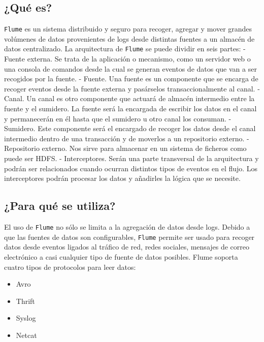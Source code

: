 \documentclass[]{article}
\begin{document}
\subsection{¿Qué es?}\label{que-es}

\texttt{Flume} es un sistema distribuido y seguro para recoger, agregar
y mover grandes volúmenes de datos provenientes de logs desde distintas
fuentes a un almacén de datos centralizado. La arquitectura de
\texttt{Flume} se puede dividir en seis partes: - Fuente externa. Se
trata de la aplicación o mecanismo, como un servidor web o una consola
de comandos desde la cual se generan eventos de datos que van a ser
recogidos por la fuente. - Fuente. Una fuente es un componente que se
encarga de recoger eventos desde la fuente externa y pasárselos
transaccionalmente al canal. - Canal. Un canal es otro componente que
actuará de almacén intermedio entre la fuente y el sumidero. La fuente
será la encargada de escribir los datos en el canal y permanecerán en él
hasta que el sumidero u otro canal los consuman. - Sumidero. Este
componente será el encargado de recoger los datos desde el canal
intermedio dentro de una transacción y de moverlos a un repositorio
externo. - Repositorio externo. Nos sirve para almacenar en un sistema
de ficheros como puede ser HDFS. - Interceptores. Serán una parte
transversal de la arquitectura y podrán ser relacionados cuando ocurran
distintos tipos de eventos en el flujo. Los interceptores podrán
procesar los datos y añadirles la lógica que se necesite.

\subsection{¿Para qué se utiliza?}\label{para-que-se-utiliza}

El uso de \texttt{Flume} no sólo se limita a la agregación de datos
desde logs. Debido a que las fuentes de datos son configurables,
\texttt{Flume} permite ser usado para recoger datos desde eventos
ligados al tráfico de red, redes sociales, mensajes de correo
electrónico a casi cualquier tipo de fuente de datos posibles. Flume
soporta cuatro tipos de protocolos para leer datos:

\begin{itemize}
\itemsep1pt\parskip0pt
\item
  Avro
\item
  Thrift
\item
  Syslog
\item
  Netcat
\end{itemize}
\end{document}
